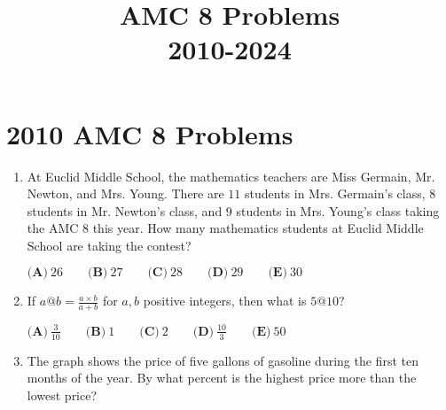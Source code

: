 \documentclass{article}
\title{AMC 8 Problems \\ 2010-2024}
\date{}
\begin{document}
\maketitle\thispagestyle{fancy}\tableofcontents\newpage\section*{2010 AMC 8 Problems}
\begin{enumerate}[label=\arabic*., itemsep=0.5em]\item At Euclid Middle School, the mathematics teachers are Miss Germain, Mr. Newton, and Mrs. Young. There are \(11\) students in Mrs. Germain's class, \(8\) students in Mr. Newton's class, and \(9\) students in Mrs. Young's class taking the AMC 8 this year. How many mathematics students at Euclid Middle School are taking the contest? 

\( \textbf{(A)}\ 26 \qquad\textbf{(B)}\ 27\qquad\textbf{(C)}\ 28\qquad\textbf{(D)}\ 29\qquad\textbf{(E)}\ 30 \)\par \vspace{0.5em}\item If \(a @ b = \frac{a\times b}{a+b}\) for \(a,b\) positive integers, then what is \(5 @ 10\)? 

\(\textbf{(A)}\ \frac{3}{10} \qquad\textbf{(B)}\ 1 \qquad\textbf{(C)}\ 2 \qquad\textbf{(D)}\ \frac{10}{3} \qquad\textbf{(E)}\ 50\)\par \vspace{0.5em}\item The graph shows the price of five gallons of gasoline during the first ten months of the year. By what percent is the highest price more than the lowest price?



\end{enumerate}
\end{document}
